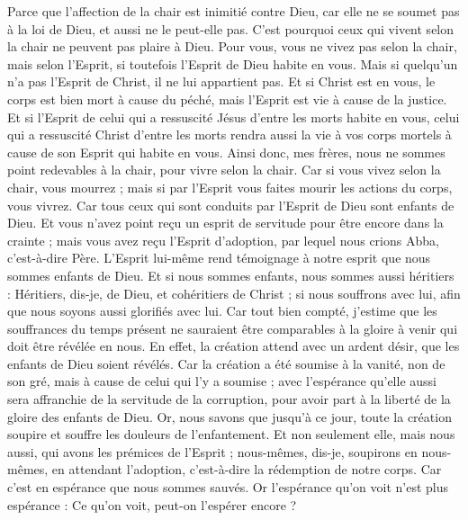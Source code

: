 \begin{multicols}{2}
Parce que l'affection de la chair est inimitié contre Dieu, car elle ne se soumet pas à la loi de Dieu, et aussi ne le peut-elle pas.
C'est pourquoi ceux qui vivent selon la chair ne peuvent pas plaire à Dieu.
Pour vous, vous ne vivez pas selon la chair, mais selon l'Esprit, si toutefois l'Esprit de Dieu habite en vous. Mais si quelqu'un n'a pas l'Esprit de Christ, il ne lui appartient pas.
Et si Christ est en vous, le corps est bien mort à cause du péché, mais l'Esprit est vie à cause de la justice.
Et si l'Esprit de celui qui a ressuscité Jésus d’entre les morts habite en vous, celui qui a ressuscité Christ d’entre les morts rendra aussi la vie à vos corps mortels à cause de son Esprit qui habite en vous.
Ainsi donc, mes frères, nous ne sommes point redevables à la chair, pour vivre selon la chair.
Car si vous vivez selon la chair, vous mourrez ; mais si par l'Esprit vous faites mourir les actions du corps, vous vivrez.
Car tous ceux qui sont conduits par l'Esprit de Dieu sont enfants de Dieu.
Et vous n'avez point reçu un esprit de servitude pour être encore dans la crainte ; mais vous avez reçu l'Esprit d'adoption, par lequel nous crions Abba, c'est-à-dire Père.
L’Esprit lui-même rend témoignage à notre esprit que nous sommes enfants de Dieu.
Et si nous sommes enfants, nous sommes aussi héritiers : Héritiers, dis-je, de Dieu, et cohéritiers de Christ ; si nous souffrons avec lui, afin que nous soyons aussi glorifiés avec lui.
Car tout bien compté, j'estime que les souffrances du temps présent ne sauraient être comparables à la gloire à venir qui doit être révélée en nous.
En effet, la création attend avec un ardent désir, que les enfants de Dieu soient révélés.
Car la création a été soumise à la vanité, non de son gré, mais à cause de celui qui l’y a soumise ;
avec l’espérance qu’elle aussi sera affranchie de la servitude de la corruption, pour avoir part à la liberté de la gloire des enfants de Dieu.
Or, nous savons que jusqu’à ce jour, toute la création soupire et souffre les douleurs de l’enfantement.
Et non seulement elle, mais nous aussi, qui avons les prémices de l'Esprit ; nous-mêmes, dis-je, soupirons en nous-mêmes, en attendant l'adoption, c'est-à-dire la rédemption de notre corps.
Car c’est en espérance que nous sommes sauvés. Or l’espérance qu’on voit n’est plus espérance : Ce qu’on voit, peut-on l’espérer encore ?

\end{multicols}
